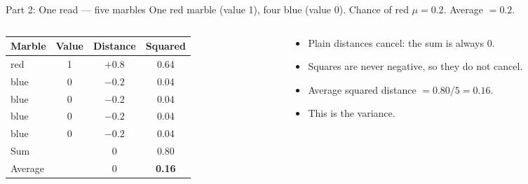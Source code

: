 \documentclass[aspectratio=169,11pt]{beamer}
\begin{document}
\begin{frame}{Part 2: One read --- five marbles}
One red marble (value 1), four blue (value 0). Chance of red $\mu = 0.2$.
Average $= 0.2$.
\medskip

\begin{columns}[T]
\begin{column}{0.55\textwidth}
\small
\begin{tabular}{@{}lccc@{}}
\toprule
Marble & Value & Distance & Squared\\
\midrule
red & 1 & $+0.8$ & 0.64\\
blue & 0 & $-0.2$ & 0.04\\
blue & 0 & $-0.2$ & 0.04\\
blue & 0 & $-0.2$ & 0.04\\
blue & 0 & $-0.2$ & 0.04\\
\midrule
Sum & & \alert{0} & 0.80\\
Average & & 0 & \textbf{0.16}\\
\bottomrule
\end{tabular}
\end{column}
\begin{column}{0.42\textwidth}
\begin{itemize}
\item Plain distances \alert{cancel}: the sum is always 0.
\item Squares are never negative, so they do not cancel.
\item Average squared distance $= 0.80 / 5 = 0.16$.
\item This is the \alert{variance}.
\end{itemize}
\end{column}
\end{columns}
\end{frame}
\end{document}
